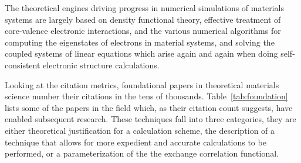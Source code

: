 The theoretical engines driving progress in numerical simulations of materials systems are
largely based on density functional theory, effective treatment of core-valence electronic interactions,
and the various numerical algorithms for computing the eigenstates of electrons in material 
systems, and solving the coupled systems of linear equations which arise 
again and again when doing self-consistent electronic structure calculations.

Looking at the citation metrics, foundational papers in theoretical materials science
number their citations in the tens of thousands.
Table~\ref{tab:foundation} lists some of the papers in the field which, as
their citation count suggests, have enabled subsequent research. These techniques fall into
three categories, they are either theoretical justification for a calculation scheme, the description of
a technique that allows for more expedient and accurate calculations to be performed, or a parameterization
of the the exchange correlation functional.

